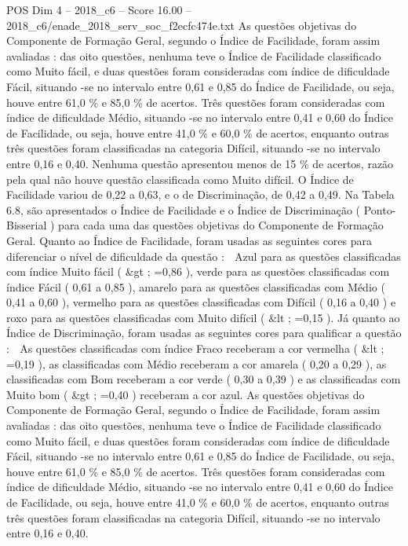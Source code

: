 \begin{textsample}{POS Dim 4 – 2018\_c6 – Score 16.00 – 2018\_c6/enade\_2018\_serv\_soc\_f2ecfc474e.txt}
As questões objetivas do Componente de Formação Geral, segundo o Índice de Facilidade, foram assim avaliadas : das oito questões, nenhuma teve o Índice de Facilidade classificado como Muito fácil, e duas questões foram consideradas com índice de dificuldade Fácil, situando -se no intervalo entre 0,61 e 0,85 do Índice de Facilidade, ou seja, houve entre 61,0 \% e 85,0 \% de acertos.
Três questões foram consideradas com índice de dificuldade Médio, situando -se no intervalo entre 0,41 e 0,60 do Índice de Facilidade, ou seja, houve entre 41,0 \% e 60,0 \% de acertos, enquanto outras três questões foram classificadas na categoria Difícil, situando -se no intervalo entre 0,16 e 0,40.
Nenhuma questão apresentou menos de 15 \% de acertos, razão pela qual não houve questão classificada como Muito difícil.
O Índice de Facilidade variou de 0,22 a 0,63, e o de Discriminação, de 0,42 a 0,49.
Na Tabela 6.8, são apresentados o Índice de Facilidade e o Índice de Discriminação ( Ponto-Bisserial ) para cada uma das questões objetivas do Componente de Formação Geral.
Quanto ao Índice de Facilidade, foram usadas as seguintes cores para diferenciar o nível de dificuldade da questão :  Azul para as questões classificadas com índice Muito fácil ( \&gt ; =0,86 ), verde para as questões classificadas com índice Fácil ( 0,61 a 0,85 ), amarelo para as questões classificadas com Médio ( 0,41 a 0,60 ), vermelho para as questões classificadas com Difícil ( 0,16 a 0,40 ) e roxo para as questões classificadas com Muito difícil ( \&lt ; =0,15 ).
Já quanto ao Índice de Discriminação, foram usadas as seguintes cores para qualificar a questão :  As questões classificadas com índice Fraco receberam a cor vermelha ( \&lt ; =0,19 ), as classificadas com Médio receberam a cor amarela ( 0,20 a 0,29 ), as classificadas com Bom receberam a cor verde ( 0,30 a 0,39 ) e as classificadas com Muito bom ( \&gt ; =0,40 ) receberam a cor azul.
As questões objetivas do Componente de Formação Geral, segundo o Índice de Facilidade, foram assim avaliadas : das oito questões, nenhuma teve o Índice de Facilidade classificado como Muito fácil, e duas questões foram consideradas com índice de dificuldade Fácil, situando -se no intervalo entre 0,61 e 0,85 do Índice de Facilidade, ou seja, houve entre 61,0 \% e 85,0 \% de acertos.
Três questões foram consideradas com índice de dificuldade Médio, situando -se no intervalo entre 0,41 e 0,60 do Índice de Facilidade, ou seja, houve entre 41,0 \% e 60,0 \% de acertos, enquanto outras três questões foram classificadas na categoria Difícil, situando -se no intervalo entre 0,16 e 0,40.

\end{textsample}

